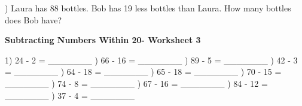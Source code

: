\documentclass{article}%
\begin{document}
\newline%
) Laura has 88 bottles. Bob has 19 less bottles than Laura. How many bottles does Bob have?%
\newline%
\newline%
\newline%
\pagebreak%
\large%
\begin{center}%
\textbf{Subtracting Numbers Within 20- Worksheet 3}%
\newline%
\newline%
\newline%
\end{center} \normalsize%
1) 24 {-} 2 = \_\_\_\_\_\_\_%
\newline%
\newline%
) 66 {-} 16 = \_\_\_\_\_\_\_%
\newline%
\newline%
) 89 {-} 5 = \_\_\_\_\_\_\_%
\newline%
\newline%
) 42 {-} 3 = \_\_\_\_\_\_\_%
\newline%
\newline%
) 64 {-} 18 = \_\_\_\_\_\_\_%
\newline%
\newline%
) 65 {-} 18 = \_\_\_\_\_\_\_%
\newline%
\newline%
) 70 {-} 15 = \_\_\_\_\_\_\_%
\newline%
\newline%
) 74 {-} 8 = \_\_\_\_\_\_\_%
\newline%
\newline%
) 67 {-} 16 = \_\_\_\_\_\_\_%
\newline%
\newline%
) 84 {-} 12 = \_\_\_\_\_\_\_%
\newline%
\newline%
) 37 {-} 4 = \_\_\_\_\_\_\_%
\newline%
\newline%
\end{document}
